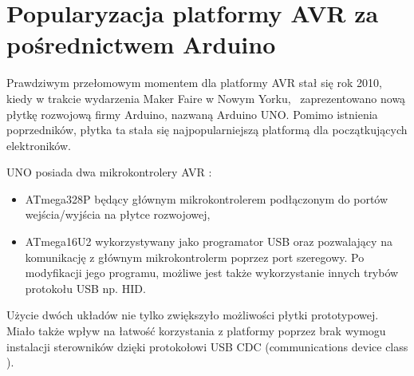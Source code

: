 \section{Popularyzacja platformy AVR za pośrednictwem Arduino}

Prawdziwym przełomowym momentem dla platformy AVR stał się rok 2010, kiedy w trakcie wydarzenia Maker Faire w Nowym Yorku, \nocomma\ zaprezentowano nową płytkę rozwojową firmy Arduino, nazwaną Arduino UNO. Pomimo istnienia poprzedników, płytka ta stała się najpopularniejszą platformą dla początkujących elektroników. 

UNO posiada  dwa mikrokontrolery AVR :
\begin{itemize}
\item ATmega328P będący głównym mikrokontrolerem podłączonym do portów wejścia/wyjścia na płytce rozwojowej,
\item ATmega16U2 wykorzystywany jako programator USB oraz pozwalający na komunikację z głównym mikrokontrolerm poprzez port szeregowy. Po modyfikacji jego programu, możliwe jest także wykorzystanie innych trybów protokołu USB np. HID.
\end{itemize}
Użycie dwóch układów nie tylko zwiększyło możliwości płytki prototypowej. Miało także wpływ na łatwość korzystania z platformy poprzez brak wymogu instalacji sterowników dzięki protokołowi USB CDC (communications device class ).

